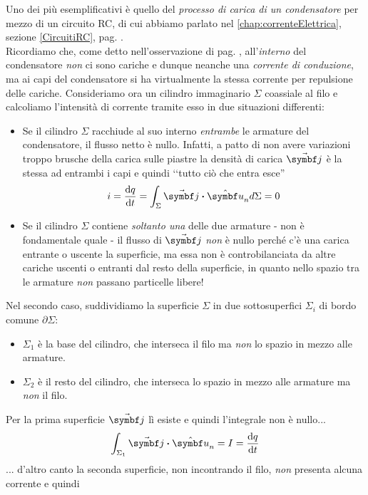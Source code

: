 Uno dei più esemplificativi è quello del \textit{processo di carica di un condensatore} per mezzo di un circuito RC, di cui abbiamo parlato nel \autoref{chap:correnteElettrica}, sezione \ref{CircuitiRC}, pag. \pageref{CircuitiRC}.\\
Ricordiamo che, come detto nell'osservazione di pag. \pageref{correntevariabile}, all'\textit{interno} del condensatore \textit{non} ci sono cariche e dunque neanche una \textit{corrente di conduzione}, ma ai capi del condensatore si ha virtualmente la stessa corrente per repulsione delle cariche. Consideriamo ora un cilindro immaginario $\Sigma$ coassiale al filo e calcoliamo l'intensità di corrente tramite esso in due situazioni differenti: 
\begin{itemize}
	\item Se il cilindro $\Sigma$ racchiude al suo interno \textit{entrambe} le armature del condensatore, il flusso netto è nullo. Infatti, a patto di non avere variazioni troppo brusche della carica sulle piastre la densità di carica $\vba{j}$ è la stessa ad entrambi i capi e quindi ‘‘tutto ciò che entra esce''
	\begin{equation*}
		i=\dv{q}{t}=\int_{\Sigma}\vba{j}\vdot\vbh{u}_nd\Sigma=0
	\end{equation*} 
	\item Se il cilindro $\Sigma$ contiene \textit{soltanto una} delle due armature - non è fondamentale quale - il flusso di $\vba{j}$ \textit{non} è nullo perché c'è una carica entrante o uscente la superficie, ma essa non è controbilanciata da altre cariche uscenti o entranti dal resto della superficie, in quanto nello spazio tra le armature \textit{non} passano particelle libere!
\end{itemize}
Nel secondo caso, suddividiamo la superficie $\Sigma$ in due sottosuperfici $\Sigma_i$ di bordo comune $\partial \Sigma$:
\begin{itemize}
	\item $\Sigma_1$ è la base del cilindro, che interseca il filo ma \textit{non} lo spazio in mezzo alle armature.
	\item $\Sigma_2$ è il resto del cilindro, che interseca lo spazio in mezzo alle armature ma \textit{non} il filo.
\end{itemize}
Per la prima superficie $\vba{j}$ lì esiste e quindi l'integrale non è nullo...
\begin{equation*}
	\int_{\Sigma_1}\vba{j}\vdot\vbh{u}_n=I=\dv{q}{t}
\end{equation*}
... d'altro canto la seconda superficie, non incontrando il filo, \textit{non} presenta alcuna corrente e quindi
